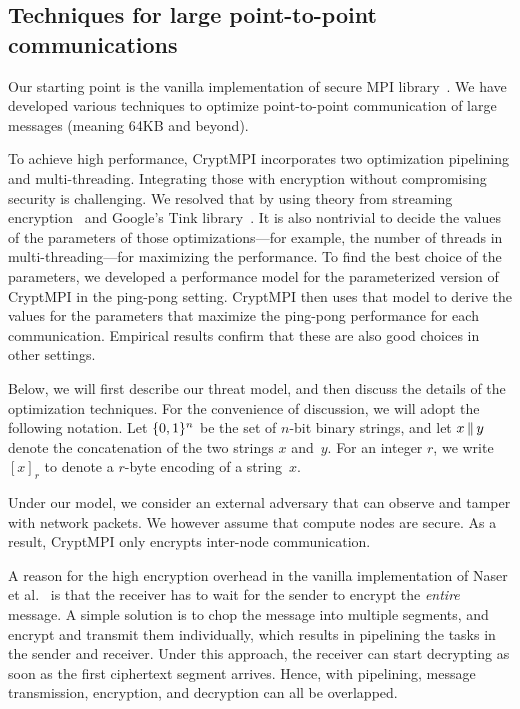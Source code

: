 \subsection{Techniques for large point-to-point communications}

Our starting point is the vanilla implementation of secure MPI
library~\cite{Cluster:Naser19}. We have developed various techniques to
optimize point-to-point communication of large messages (meaning 64KB and beyond).

To achieve high performance, CryptMPI incorporates two optimization
pipelining and multi-threading. Integrating those with encryption without
compromising security is challenging. We resolved that by using theory from
streaming encryption~\cite{C:HRRV15} and Google's Tink library~\cite{tink}.
It is also nontrivial to decide the values of the parameters of those
optimizations---for example, the number of threads in multi-threading---for
maximizing the performance. To find the best choice of the parameters, we
developed a performance model for the parameterized version of CryptMPI in the
ping-pong setting.
CryptMPI then uses that model to derive the values for the parameters that
maximize the ping-pong performance for each communication.
Empirical results confirm that these are also good choices in
other settings.

Below, we will first describe our threat model,
and then discuss the details of the optimization techniques.
For the convenience of discussion,
we will adopt the following notation.
Let $\{0,1\}^n$ be the set of $n$-bit binary strings,
and let $x {\,\|\,} y$
denote the concatenation of the two strings $x$ and~$y$.
For an integer $r$, we write $[x]_r$ to denote a $r$-byte encoding
of a string~$x$.

Under our model, we consider an external
adversary that can observe and tamper with network packets.
We however assume that compute nodes are secure.
As a result, CryptMPI only encrypts inter-node communication.

A reason for the high encryption overhead in the vanilla
implementation of Naser et al.~\cite{Cluster:Naser19}
is that the receiver has to wait for the sender to
encrypt the \emph{entire} message. A simple solution is to chop the
message into multiple segments, and encrypt and transmit them individually, which
results in pipelining the tasks in  the sender and receiver.
Under this approach, the receiver can start decrypting as soon as the
first ciphertext segment arrives. Hence, with pipelining, message transmission,
encryption, and decryption can all be overlapped.


